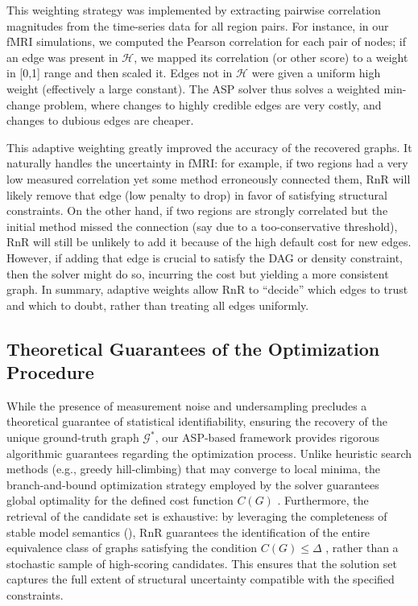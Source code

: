 This weighting strategy was implemented by extracting pairwise correlation magnitudes from the time-series data for all region pairs. For instance, in our fMRI simulations, we computed the Pearson correlation for each pair of nodes; if an edge was present in $\mathcal{H}$, we mapped its correlation (or other score) to a weight in [0,1] range and then scaled it. Edges not in $\mathcal{H}$ were given a uniform high weight (effectively a large constant). The ASP solver thus solves a weighted min-change problem, where changes to highly credible edges are very costly, and changes to dubious edges are cheaper. 

This adaptive weighting greatly improved the accuracy of the recovered graphs. It naturally handles the uncertainty in fMRI: for example, if two regions had a very low measured correlation yet some method erroneously connected them, RnR will likely remove that edge (low penalty to drop) in favor of satisfying structural constraints. On the other hand, if two regions are strongly correlated but the initial method missed the connection (say due to a too-conservative threshold), RnR will still be unlikely to add it because of the high default cost for new edges. However, if adding that edge is crucial to satisfy the DAG or density constraint, then the solver might do so, incurring the cost but yielding a more consistent graph. In summary, adaptive weights allow RnR to “decide” which edges to trust and which to doubt, rather than treating all edges uniformly.

\subsection{Theoretical Guarantees of the Optimization Procedure}
While the presence of measurement noise and undersampling precludes a theoretical guarantee of statistical identifiability, ensuring the recovery of the unique ground-truth graph $\mathcal{G}^*$, our ASP-based framework provides rigorous algorithmic guarantees regarding the optimization process. Unlike heuristic search methods (e.g., greedy hill-climbing) that may converge to local minima, the branch-and-bound optimization strategy employed by the solver guarantees global optimality for the defined cost function $C(G)$ \cite{gebser2012conflict}. Furthermore, the retrieval of the candidate set is exhaustive: by leveraging the completeness of stable model semantics (\cite{lifschitz2002answer}), RnR guarantees the identification of the entire equivalence class of graphs satisfying the condition $C(G) \le \Delta$ , rather than a stochastic sample of high-scoring candidates. This ensures that the solution set captures the full extent of structural uncertainty compatible with the specified constraints.


